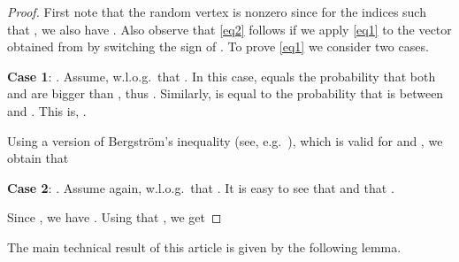 \documentclass{article}
\theoremstyle{definition}
\theoremstyle{remark}
\numberwithin{equation}{section}
\begin{document}
\begin{proof}
First note that the random vertex  is nonzero since for the indices  such that , we also have . Also observe that \eqref{eq2} follows if we apply \eqref{eq1} to the vector  obtained from   by switching the sign of .
To prove \eqref{eq1} we consider two cases.

\smallskip
\noindent \textbf{Case 1}: . Assume, w.l.o.g.~that . In this case,  equals the probability that 
both  and  are bigger than , thus . Similarly,  is equal to the probability that  is between  and 
. This is, .

Using a version of  Bergstr\"om's inequality (see, e.g.~\cite{inequalities}), 
 which is valid for  and , we obtain that


\noindent \textbf{Case 2}: . Assume again, w.l.o.g.~that . It is easy to see that  
and that .

Since , we have . Using that , we get

\end{proof}

\bigskip

The main technical result of this article is given by the following lemma.
\end{document}
